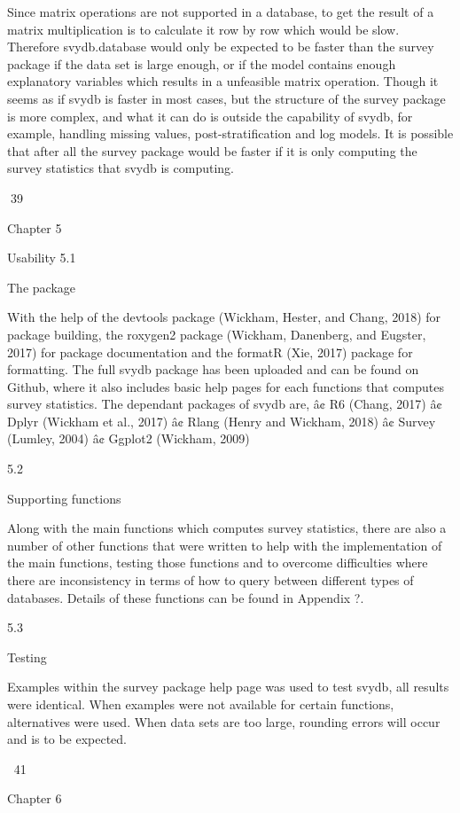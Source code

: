 Since matrix operations are not supported in a database, to get the result of a matrix multiplication is to calculate it row by row which would be slow. Therefore
svydb.database would only be expected to be faster than the survey package if
the data set is large enough, or if the model contains enough explanatory variables
which results in a unfeasible matrix operation.
Though it seems as if svydb is faster in most cases, but the structure of the survey
package is more complex, and what it can do is outside the capability of svydb, for
example, handling missing values, post-stratification and log models. It is possible
that after all the survey package would be faster if it is only computing the survey
statistics that svydb is computing.

39

Chapter 5

Usability
5.1

The package

With the help of the devtools package (Wickham, Hester, and Chang, 2018) for package building, the roxygen2 package (Wickham, Danenberg, and Eugster, 2017) for
package documentation and the formatR (Xie, 2017) package for formatting. The
full svydb package has been uploaded and can be found on Github, where it also
includes basic help pages for each functions that computes survey statistics.
The dependant packages of svydb are,
â¢ R6 (Chang, 2017)
â¢ Dplyr (Wickham et al., 2017)
â¢ Rlang (Henry and Wickham, 2018)
â¢ Survey (Lumley, 2004)
â¢ Ggplot2 (Wickham, 2009)

5.2

Supporting functions

Along with the main functions which computes survey statistics, there are also a
number of other functions that were written to help with the implementation of the
main functions, testing those functions and to overcome difficulties where there are
inconsistency in terms of how to query between different types of databases. Details
of these functions can be found in Appendix ?.

5.3

Testing

Examples within the survey package help page was used to test svydb, all results
were identical. When examples were not available for certain functions, alternatives
were used. When data sets are too large, rounding errors will occur and is to be
expected.

41

Chapter 6

